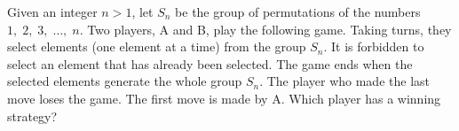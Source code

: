 Given an integer \(n>1\), let \(S_n\) be the group of permutations of the numbers \(1,\;2,\;3,\;\ldots,\;n\). Two players, A and B, play the following game. Taking turns, they select elements (one element at a time) from the group \(S_n\). It is forbidden to select an element that has already been selected. The game ends when the selected elements generate the whole group \(S_n\). The player who made the last move loses the game. The first move is made by A. Which player has a winning strategy?

